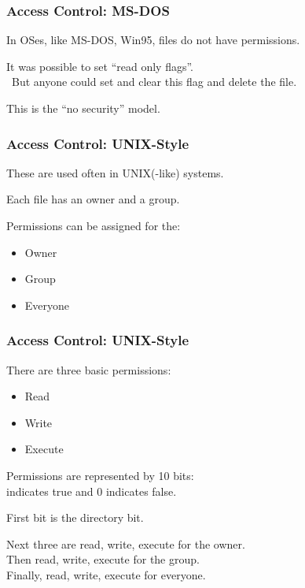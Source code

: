 \begin{frame}
\frametitle{Access Control: MS-DOS}
\begin{changemargin}{1cm}

In OSes, like MS-DOS, Win95, files do not have permissions.

It was possible to set ``read only flags''.\\\
\quad But anyone could set and clear this flag and delete the file.

This is the ``no security'' model.

\end{changemargin}
\end{frame}

\begin{frame}
\frametitle{Access Control: UNIX-Style}
\begin{changemargin}{1cm}

These are used often in UNIX(-like) systems.

Each file has an owner and a group. 

Permissions can be assigned for the:
\begin{itemize}
	\item Owner
	\item Group
	\item Everyone
\end{itemize}

\end{changemargin}
\end{frame}

\begin{frame}
\frametitle{Access Control: UNIX-Style}
\begin{changemargin}{1cm}

There are three basic permissions: 

\begin{itemize}
	\item Read
	\item Write
	\item Execute
\end{itemize}

Permissions are represented by 10 bits:\\ 
 indicates true and 0 indicates false.

First bit is the directory bit.

Next three are read, write, execute for the owner.\\
Then read, write, execute for the group.\\
Finally, read, write, execute for everyone.

\end{changemargin}
\end{frame}

